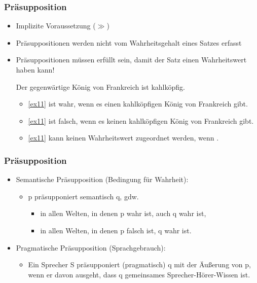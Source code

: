 \begin{frame}
\frametitle{Präsupposition}

\begin{itemize}
	\item Implizite Voraussetzung ($\gg$)
	\item Präsuppositionen werden nicht vom Wahrheitsgehalt eines Satzes erfasst
	\item Präsuppositionen müssen erfüllt sein, damit der Satz einen Wahrheitswert haben kann!

\vspace{1ex}

		\ea \label{ex11} Der gegenwärtige König von Frankreich ist kahlköpfig.
		\z
		
		\begin{itemize}
			\item \ref{ex11} ist wahr, wenn es einen kahlköpfigen König von Frankreich gibt.
			\item\ref{ex11} ist falsch, wenn es keinen kahlköpfigen König von Frankreich gibt.
			\item \ref{ex11} kann keinen Wahrheitswert zugeordnet werden, wenn .
		\end{itemize}
	
\end{itemize}

\end{frame}




\begin{frame}
\frametitle{Präsupposition}

\begin{itemize}
	\item Semantische Präsupposition  (Bedingung für Wahrheit):
	
	\begin{itemize}
		\item p präsupponiert semantisch q, gdw.

		\begin{itemize}
			\item in allen Welten, in denen p wahr ist, auch q wahr ist,
			\item in allen Welten, in denen p falsch ist, q wahr ist.
		\end{itemize}

	\end{itemize}
	
\vspace{1ex}

	\item Pragmatische Präsupposition (Sprachgebrauch):
	
	\begin{itemize}
		\item Ein Sprecher S präsupponiert (pragmatisch) q mit der Äu\ss{}erung von p, wenn er davon ausgeht, dass q gemeinsames Sprecher-Hörer-Wissen ist.
	\end{itemize}
	
\end{itemize}

\end{frame}


